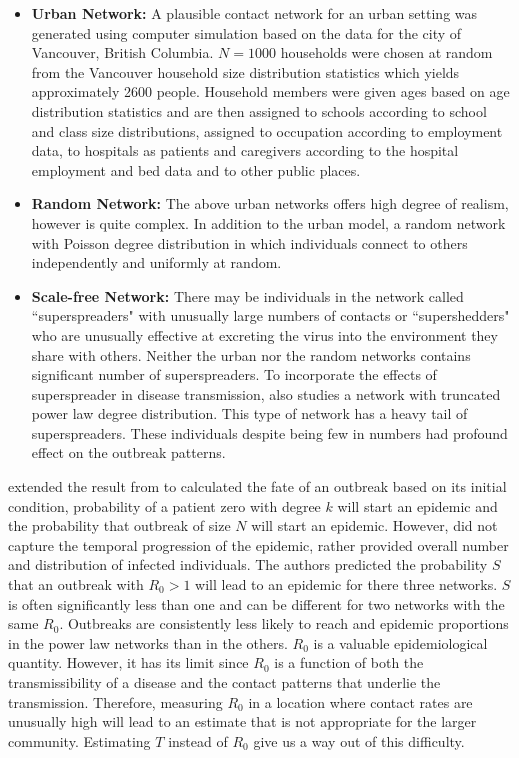 \documentclass[10pt, journal,onecolumn]{IEEEtran}
\begin{document}
\begin{itemize}
\item \textbf{Urban Network:} A plausible contact network for an urban setting was generated using computer simulation based on the data for the city of Vancouver, British Columbia. $N=1000$ households were chosen at random from the Vancouver household size distribution statistics which yields approximately 2600 people. Household members were given ages based on age distribution statistics and are then assigned to schools according to school and class size distributions, assigned to occupation according to employment data, to hospitals as patients and caregivers according to the hospital employment and bed data and to other public places.
\item \textbf{Random Network:} The above urban networks offers high degree of realism, however is quite complex. In addition to the urban model, a random network with Poisson degree distribution in which individuals connect to others independently and uniformly at random.
\item \textbf{Scale-free Network:} There may be individuals in the network called ``superspreaders" with unusually large numbers of contacts or ``supershedders" who are unusually effective at excreting the virus into the environment they share with others. Neither the urban nor the random networks contains significant number of superspreaders. To incorporate the effects of superspreader in disease transmission, \citep{meyers2005network} also studies a network with truncated power law degree distribution. This type of network has a heavy tail of superspreaders. These individuals despite being few in numbers had profound effect on the outbreak patterns.
\end{itemize}

 \citep{meyers2005network} extended the result from \citep{newman2002spread} to calculated the fate of an outbreak based on its initial condition, probability of a patient zero with degree $k$ will start an epidemic and the probability that outbreak of size $N$ will start an epidemic. However, \citep{newman2002spread} did not capture the temporal progression of the epidemic, rather provided overall number and distribution of infected individuals. The authors predicted the probability $S$ that an outbreak with $R_0>1$ will lead to an epidemic for there three networks. $S$ is often significantly less than one and can be different for two networks with the same $R_0$. Outbreaks are consistently less likely to reach and epidemic proportions in the power law networks than in the others. $R_0$ is a valuable epidemiological quantity. However, it has its limit since $R_0$ is a function of both the transmissibility of a disease and the contact patterns that underlie the transmission. Therefore, measuring $R_0$ in a location where contact rates are unusually high will lead to an estimate that is not appropriate for the larger community.  Estimating $T$ instead of $R_0$ give us a way out of this difficulty.
\end{document}
